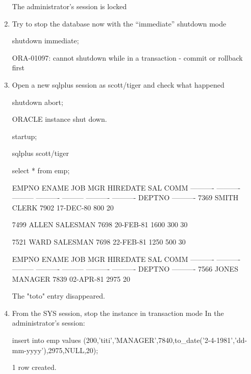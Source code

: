 \documentclass{article}
\begin{document}
\begin{enumerate}
The administrator’s session is locked 

  \item Try to stop the database now with the “immediate” shutdown mode
  \begin{sqlshell}
shutdown immediate;
\end{sqlshell}
\begin{messageshell}
ORA-01097: cannot shutdown while in a transaction - commit or rollback first
\end{messageshell}
  \item Open a new sqlplus session as scott/tiger and check what happened 
\begin{sqlshell}
shutdown abort;
\end{sqlshell}
\begin{messageshell}
ORACLE instance shut down.
\end{messageshell}
\begin{sqlshell}
startup;
\end{sqlshell}
\begin{commandshell}
sqlplus scott/tiger
\end{commandshell}
\begin{sqlshell}
select * from emp;
\end{sqlshell}
\begin{messageshell}
EMPNO ENAME      JOB              MGR HIREDATE           SAL       COMM
---------- ---------- --------- ---------- --------- ---------- ----------
    DEPTNO
----------
      7369 SMITH      CLERK             7902 17-DEC-80           800
       20

      7499 ALLEN      SALESMAN             7698 20-FEB-81          1600        300
       30

      7521 WARD       SALESMAN             7698 22-FEB-81          1250        500
       30


     EMPNO ENAME      JOB              MGR HIREDATE           SAL       COMM
---------- ---------- --------- ---------- --------- ---------- ----------
    DEPTNO
----------
      7566 JONES      MANAGER             7839 02-APR-81          2975
       20


\end{messageshell}
The "toto" entry disappeared.
  \item From the SYS session, stop the instance in transaction mode 
In the administrator's session:
  \begin{sqlshell}
insert into emp values
(200,'titi','MANAGER',7840,to_date('2-4-1981','dd-mm-yyyy'),2975,NULL,20);
\end{sqlshell}
\begin{messageshell}
1 row created.
\end{messageshell}


\end{enumerate}
\end{document}

